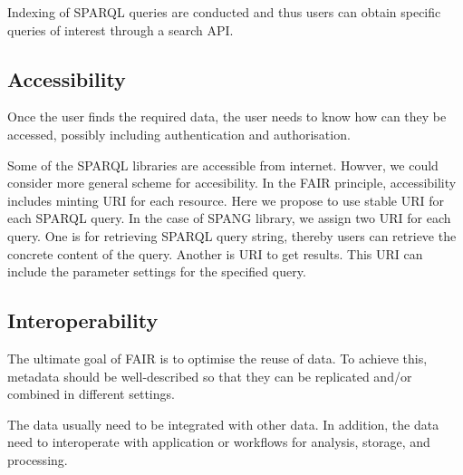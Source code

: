 \documentclass[runningheads]{llncs}
\begin{document}
Indexing of SPARQL queries are conducted and thus users can obtain specific queries of interest through a search API.

\subsection{Accessibility}
Once the user finds the required data, the user needs to know how can they be accessed, possibly including authentication and authorisation.

Some of the SPARQL libraries are accessible from internet. Howver, we could consider more general scheme for accesibility. In the FAIR principle, accessibility includes minting URI for each resource. Here we propose to use stable URI for each SPARQL query.
In the case of SPANG library, we assign two URI for each query. One is for retrieving SPARQL query string, thereby users can retrieve the concrete content of the query. Another is URI to get results. This URI can include the parameter settings for the specified query.

\subsection{Interoperability}
The ultimate goal of FAIR is to optimise the reuse of data. To achieve this, metadata should be well-described so that they can be replicated and/or combined in different settings.

The data usually need to be integrated with other data. In addition, the data need to interoperate with application or workflows for analysis, storage, and processing.
\end{document}
